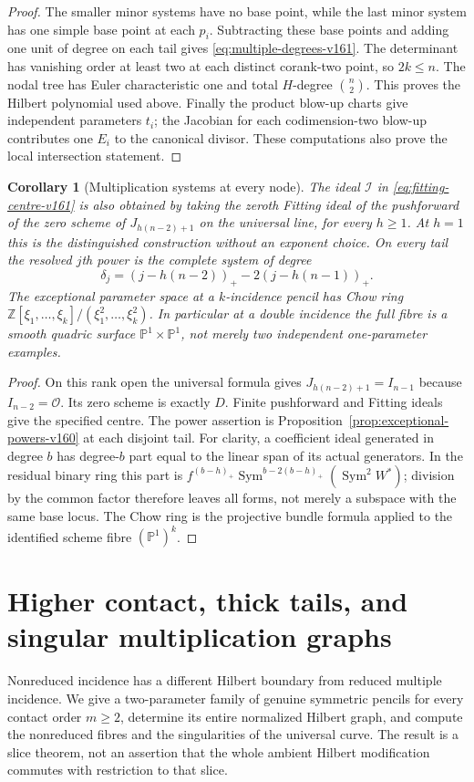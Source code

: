 \documentclass[11pt,reqno]{amsart}
\numberwithin{equation}{section}
\newtheorem{corollary}[theorem]{Corollary}
\theoremstyle{definition}\newtheorem{definition}[theorem]{Definition}
\theoremstyle{remark}\newtheorem{remark}[theorem]{Remark}
\newcommand{\Pj}{\mathbb P}\newcommand{\A}{\mathbb A}
\newcommand{\OO}{\mathcal O}\newcommand{\II}{\mathcal I}
\DeclareMathOperator{\Sym}{Sym}\DeclareMathOperator{\Gr}{Gr}
\begin{document}
\begin{proof}
The smaller minor systems have no base point, while the last minor
system has one simple base point at each $p_i$. Subtracting these
base points and adding one unit of degree on each tail gives
\eqref{eq:multiple-degrees-v161}. The determinant has vanishing order
at least two at each distinct corank-two point, so $2k\leq n$.
The nodal tree has Euler characteristic one and total $H$-degree
$\binom n2$. This proves the Hilbert polynomial used above. Finally
the product blow-up charts give independent parameters $t_i$; the
Jacobian for each codimension-two blow-up contributes one $E_i$ to
the canonical divisor. These computations also prove the local
intersection statement.
\end{proof}

\begin{corollary}[Multiplication systems at every node]
\label{cor:multi-powers-v161}
The ideal $\mathcal I$ in \eqref{eq:fitting-centre-v161} is also obtained
by taking the zeroth Fitting ideal of the pushforward of the zero
scheme of $J_{h(n-2)+1}$ on the universal line, for every $h\geq1$.
At $h=1$ this is the distinguished construction without an exponent
choice. On every tail the resolved $j$th power is the complete system
of degree
\[
 \delta_j=(j-h(n-2))_+-2(j-h(n-1))_+.
\]
The exceptional parameter space at a $k$-incidence pencil has Chow
ring $\mathbb Z[\xi_1,\ldots,\xi_k]/(\xi_1^2,\ldots,\xi_k^2)$.
In particular at a double incidence the full fibre is a smooth
quadric surface $\Pj^1\times\Pj^1$, not merely two independent
one-parameter examples.
\end{corollary}
\begin{proof}
On this rank open the universal formula gives
$J_{h(n-2)+1}=I_{n-1}$ because $I_{n-2}=\OO$. Its zero scheme is
exactly $D$. Finite pushforward and Fitting ideals give the specified
centre. The power assertion is Proposition~\ref{prop:exceptional-powers-v160}
at each disjoint tail. For clarity, a coefficient ideal generated in
degree $b$ has degree-$b$ part equal to the linear span of its actual
generators. In the residual binary ring this part is
$f^{(b-h)_+}\Sym^{b-2(b-h)_+}(\Sym^2W^*)$; division by the common
factor therefore leaves all forms, not merely a subspace with the
same base locus. The Chow ring is the projective bundle formula
applied to the identified scheme fibre $(\Pj^1)^k$.
\end{proof}


\section{Higher contact, thick tails, and singular multiplication graphs}
\label{sec:higher-contact-v161}
Nonreduced incidence has a different Hilbert boundary from reduced
multiple incidence. We give a two-parameter family of genuine symmetric
pencils for every contact order $m\geq2$, determine its entire normalized
Hilbert graph, and compute the nonreduced fibres and the singularities
of the universal curve. The result is a slice theorem, not an assertion
that the whole ambient Hilbert modification commutes with restriction
to that slice.
\end{document}
